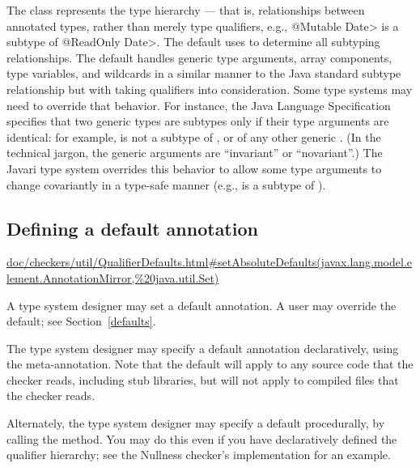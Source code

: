 The  class represents the type hierarchy ---
that is, relationships between
annotated types, rather than merely type qualifiers, e.g., \<@Mutable
Date> is a subtype of \<@ReadOnly Date>.  The default  uses
 to determine all subtyping relationships.
The default  handles
generic type arguments, array components, type variables, and
wildcards in a similar manner to the Java standard subtype
relationship but with taking qualifiers into consideration.  Some type
systems may need to override that behavior.  For instance, the Java
Language Specification specifies that two generic types are subtypes only
if their type arguments are identical:  for example,
 is not a subtype of , or of any other
generic .
(In the technical jargon, the generic arguments are ``invariant'' or ``novariant''.)
The Javari type system overrides this
behavior to allow some type arguments to change covariantly in a type-safe
manner (e.g.,
 is a subtype of ).


\subsection{Defining a default annotation\label{typesystem-defaults}}


\urldef{\setAbsoluteDefaultsURL}\url{doc/checkers/util/QualifierDefaults.html#setAbsoluteDefaults(javax.lang.model.element.AnnotationMirror,%20java.util.Set)}

A type system designer may set a default annotation.  A user may override
the default; see Section~\ref{defaults}.

The type system designer may specify a default annotation declaratively,
using the 
meta-annotation.
Note that the default will apply to any source code that the checker reads,
including stub libraries, but will not apply to compiled 
files that the checker reads.

Alternately, the type system designer may specify a default procedurally,
by calling the
method.  You may do this even if you have declaratively defined the
qualifier hierarchy; see the Nullness checker's implementation for an
example.


